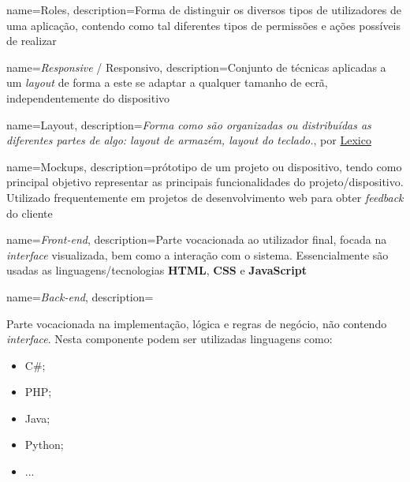 








{
    name=Roles,
    description={Forma de distinguir os diversos tipos de utilizadores de uma aplicação, contendo como tal diferentes tipos de permissões e ações possíveis de realizar}
}

{
    name=\textit{Responsive} / Responsivo,
    description={Conjunto de técnicas aplicadas a um \textit{layout} de forma a este se adaptar a qualquer tamanho de ecrã, independentemente do dispositivo}
}

{
    name=Layout,
	description={\textit{Forma como são organizadas ou distribuídas as diferentes partes de algo: layout de armazém, layout do teclado.}, por \href{https://www.lexico.pt/layout/}{Lexico}}
}

{
    name=Mockups,
	description={prótotipo de um projeto ou dispositivo, tendo como principal objetivo representar as principais funcionalidades do projeto/dispositivo. Utilizado frequentemente em projetos de desenvolvimento web para obter \textit{feedback} do cliente}
}

{
    name=\textit{Front-end},
	description={Parte vocacionada ao utilizador final, focada na \textit{interface} visualizada, bem como a interação com o sistema. Essencialmente são usadas as linguagens/tecnologias \textbf{HTML}, \textbf{CSS} e \textbf{JavaScript}}
}

{
    name=\textit{Back-end},
	description={Parte vocacionada na implementação, lógica e regras de negócio, não contendo \textit{interface}. Nesta componente podem ser utilizadas linguagens como:
	\begin{itemize}
		\item C\#;
		\item PHP;
		\item Java;
		\item Python;
		\item ...
	\end{itemize}}
}

